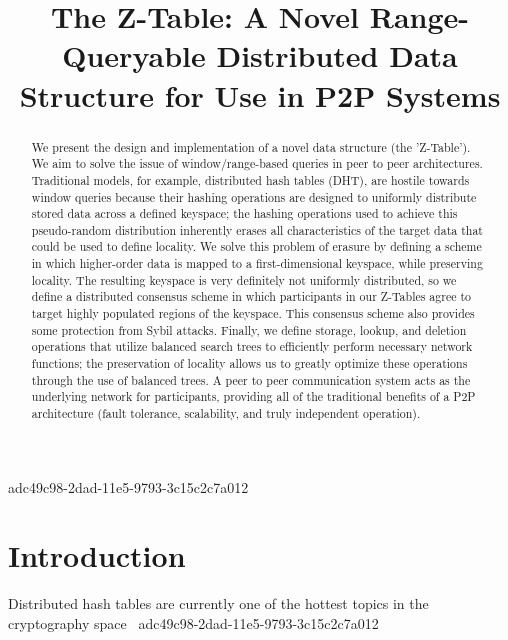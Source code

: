 \documentclass[12pt]{article}
\title{The Z-Table: A Novel Range-Queryable Distributed Data Structure for Use in P2P Systems}
\begin{document}
\maketitle

\begin{abstract}
We present the design and implementation of a novel data structure (the 'Z-Table'). We aim to solve the issue of window/range-based queries in peer to peer architectures. Traditional models, for example,  distributed hash tables (DHT), are hostile towards window queries because their hashing operations are designed to uniformly distribute stored data across a defined keyspace; the hashing operations used to achieve this pseudo-random distribution inherently erases all characteristics of the target data that could be used to define locality. We solve this problem of erasure by defining a scheme in which higher-order data is mapped to a first-dimensional keyspace, while preserving locality. The resulting keyspace is very definitely not uniformly distributed, so we define a distributed consensus scheme in which participants in our Z-Tables agree to target highly populated regions of the keyspace. This consensus scheme also provides some protection from Sybil attacks. Finally, we define storage, lookup, and deletion operations that utilize balanced search trees to efficiently perform necessary network functions; the preservation of locality allows us to greatly optimize these operations through the use of balanced trees. A peer to peer communication system acts as the underlying network for participants, providing all of the traditional benefits of a P2P architecture (fault tolerance, scalability, and truly independent operation).
\end{abstract}


adc49c98-2dad-11e5-9793-3c15c2c7a012\newpage
\section{Introduction}
Distributed hash tables are currently one of the hottest topics in the cryptography space~\cite{Stoica:2001dj,Rowstron:2001ea,Ratnasamy:2001wn}
adc49c98-2dad-11e5-9793-3c15c2c7a012
\printbibliography
\end{document}
